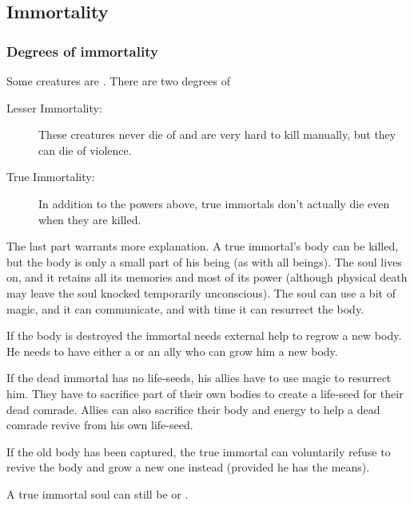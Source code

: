 \subsection{Immortality}





\subsubsection{Degrees of immortality}
Some creatures are . 
There are two degrees of 

\begin{description}
  \item[Lesser Immortality:] 
    These creatures never die of  and are very hard to kill manually, but they can die of violence. 
  \item[True Immortality:]
    In addition to the powers above, true immortals don't actually die even when they are killed. 
\end{description}

The last part warrants more explanation. 
A true immortal's body can be killed, but the body is only a small part of his being (as with all beings). 
The soul lives on, and it retains all its memories and most of its power (although physical death may leave the soul knocked temporarily unconscious). 
The soul can use a bit of magic, and it can communicate, and with time it can resurrect the body. 

If the body is destroyed the immortal needs external help to regrow a new body. 
He needs to have either a  or an ally who can grow him a new body.

If the dead immortal has no life-seeds, his allies have to use magic to resurrect him.
They have to sacrifice part of their own bodies to create a life-seed for their dead comrade. 
Allies can also sacrifice their body and energy to help a dead comrade revive from his own life-seed. 

If the old body has been captured, the true immortal can voluntarily refuse to revive the body and grow a new one instead (provided he has the means).

A true immortal soul can still be  or . 

